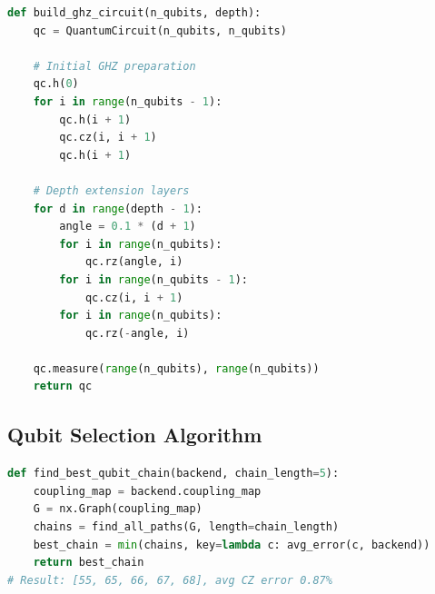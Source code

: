 \documentclass[12pt,letterpaper]{article}
\begin{document}
\begin{lstlisting}[language=Python, caption={GHZ circuit builder with depth extension.}]
def build_ghz_circuit(n_qubits, depth):
    qc = QuantumCircuit(n_qubits, n_qubits)

    # Initial GHZ preparation
    qc.h(0)
    for i in range(n_qubits - 1):
        qc.h(i + 1)
        qc.cz(i, i + 1)
        qc.h(i + 1)

    # Depth extension layers
    for d in range(depth - 1):
        angle = 0.1 * (d + 1)
        for i in range(n_qubits):
            qc.rz(angle, i)
        for i in range(n_qubits - 1):
            qc.cz(i, i + 1)
        for i in range(n_qubits):
            qc.rz(-angle, i)

    qc.measure(range(n_qubits), range(n_qubits))
    return qc
\end{lstlisting}

\subsection{Qubit Selection Algorithm}

\begin{lstlisting}[language=Python, caption={Optimal qubit chain selection.}]
def find_best_qubit_chain(backend, chain_length=5):
    coupling_map = backend.coupling_map
    G = nx.Graph(coupling_map)
    chains = find_all_paths(G, length=chain_length)
    best_chain = min(chains, key=lambda c: avg_error(c, backend))
    return best_chain
# Result: [55, 65, 66, 67, 68], avg CZ error 0.87%
\end{lstlisting}
\end{document}
